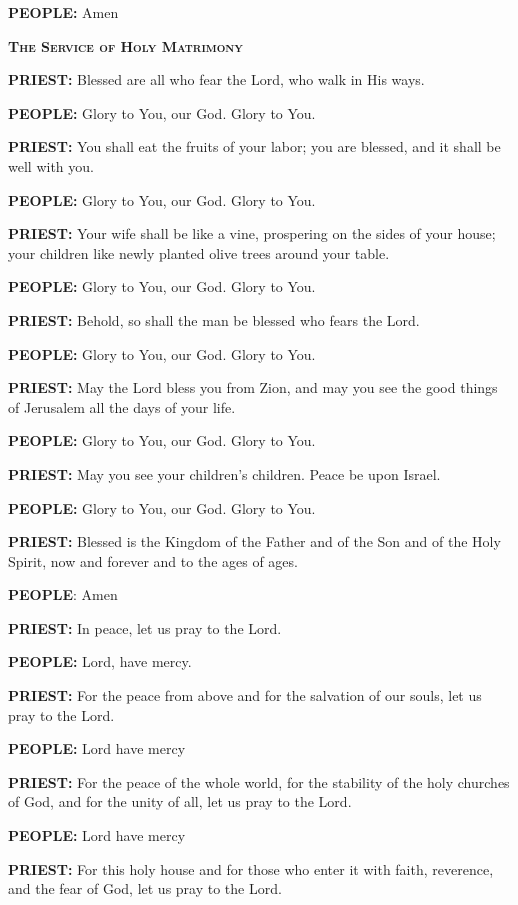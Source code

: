 \textbf{PEOPLE:} Amen

\textbf{\textsc{The Service of Holy Matrimony}}

\textbf{PRIEST:} Blessed are all who fear the Lord, who walk in His
ways.

\textbf{PEOPLE:} Glory to You, our God. Glory to You.

\textbf{PRIEST:} You shall eat the fruits of your labor; you are
blessed, and it shall be well with you.

\textbf{PEOPLE:} Glory to You, our God. Glory to You.

\textbf{PRIEST:} Your wife shall be like a vine, prospering on the sides
of your house; your children like newly planted olive trees around your
table.

\textbf{PEOPLE:} Glory to You, our God. Glory to You.

\textbf{PRIEST:} Behold, so shall the man be blessed who fears the Lord.

\textbf{PEOPLE:} Glory to You, our God. Glory to You.

\textbf{PRIEST:} May the Lord bless you from Zion, and may you see the
good things of Jerusalem all the days of your life.

\textbf{PEOPLE:} Glory to You, our God. Glory to You.

\textbf{PRIEST:} May you see your children's children. Peace be upon
Israel.

\textbf{PEOPLE:} Glory to You, our God. Glory to You.

\textbf{PRIEST:} Blessed is the Kingdom of the Father and of the Son and
of the Holy Spirit, now and forever and to the ages of ages.

\textbf{PEOPLE}: Amen

\textbf{PRIEST:} In peace, let us pray to the Lord.

\textbf{PEOPLE:} Lord, have mercy.

\textbf{PRIEST:} For the peace from above and for the salvation of our
souls, let us pray to the Lord.

\textbf{PEOPLE:} Lord have mercy

\textbf{PRIEST:} For the peace of the whole world, for the stability of
the holy churches of God, and for the unity of all, let us pray to the
Lord.

\textbf{PEOPLE:} Lord have mercy

\textbf{PRIEST:} For this holy house and for those who enter it with
faith, reverence, and the fear of God, let us pray to the Lord.


